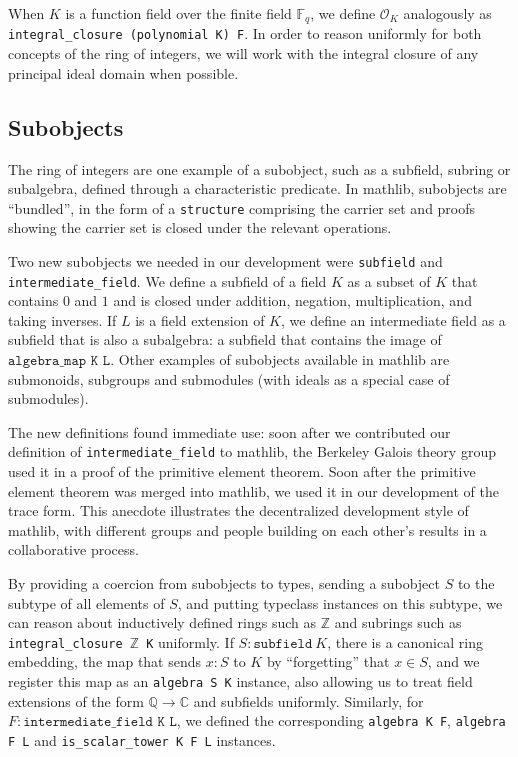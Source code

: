 \documentclass[a4paper,USenglish,cleveref, autoref, thm-restate]{lipics-v2021}
\newcommand{\C}{\mathbb{C}}
\newcommand{\lean}[1]{\texttt{#1}\xspace} %
\newcommand*{\OK}[1][K]{\mathcal{O}_{#1}}
\newcommand*{\Fq}[1][q]{\mathbb{F}_{#1}}
\newcommand{\mathlib}{\textsf{mathlib}\xspace}
\newcommand{\Q}{\mathbb{Q}}
\newcommand{\Z}{\mathbb{Z}}
\begin{document}
When $K$ is a function field over the finite field $\Fq$, we define $\OK$ analogously as \lean{integral\_closure (polynomial K) F}.
In order to reason uniformly for both concepts of the ring of integers,
we will work with the integral closure of any principal ideal domain when possible.

\subsection{Subobjects} \label{sec:subobjects}

The ring of integers are one example of a subobject, such as a subfield, subring or subalgebra, defined through a characteristic predicate.
In \mathlib, subobjects are ``bundled'', in the form of a \lean{structure} comprising the carrier set and proofs showing the carrier set is closed under the relevant operations.

Two new subobjects we needed in our development were \lean{subfield} and \lean{intermediate\-\_field}.
We define a subfield of a field $K$ as a subset of $K$ that contains $0$ and $1$ and is closed under addition, negation, multiplication, and taking inverses.
If $L$ is a field extension of $K$, we define an intermediate field as a subfield that is also a subalgebra: a subfield that contains the image of $\lean{algebra\_map K L}$.
Other examples of subobjects available in \mathlib are submonoids, subgroups and submodules (with ideals as a special case of submodules).

The new definitions found immediate use:
soon after we contributed our definition of \lean{intermediate\_field} to \mathlib,
the Berkeley Galois theory group used it in a proof of the primitive element theorem.
Soon after the primitive element theorem was merged into \mathlib,
we used it in our development of the trace form.
This anecdote illustrates the decentralized development style of \mathlib,
with different groups and people building on each other's results in a collaborative process.

By providing a coercion from subobjects to types, sending a subobject $S$ to the subtype of all elements of $S$,
and putting typeclass instances on this subtype,
we can reason about inductively defined rings such as $\Z$ and subrings such as \lean{integral\_closure $\Z$ K} uniformly.
If $S : \lean{subfield}\ K$, there is a canonical ring embedding, the map that sends $x : S$ to $K$ by ``forgetting'' that $x \in S$,
and we register this map as an \lean{algebra S K} instance, also allowing us to treat field extensions of the form $\Q \to \C$ and subfields uniformly.
Similarly, for $F : \lean{intermediate\_field K L}$, we defined the corresponding \lean{algebra K F}, \lean{algebra F L} and \lean{is\_scalar\_tower K F L} instances.
\end{document}
